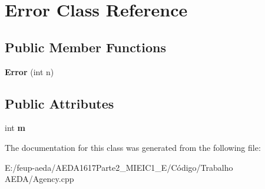 \hypertarget{class_error}{}\section{Error Class Reference}
\label{class_error}
\subsection*{Public Member Functions}
\begin{DoxyCompactItemize}
\item 
\mbox{\label{class_error_a50648efaa6adc6a84b7c90c99d47a99c}} 
{\bfseries Error} (int n)
\end{DoxyCompactItemize}
\subsection*{Public Attributes}
\begin{DoxyCompactItemize}
\item 
\mbox{\label{class_error_a009048d633be19ff0ec45acd04475695}} 
int {\bfseries m}
\end{DoxyCompactItemize}


The documentation for this class was generated from the following file\+:\begin{DoxyCompactItemize}
\item 
E\+:/feup-\/aeda/\+A\+E\+D\+A1617\+Parte2\+\_\+M\+I\+E\+I\+C1\+\_\+\+E/\+Código/\+Trabalho A\+E\+D\+A/Agency.\+cpp\end{DoxyCompactItemize}
